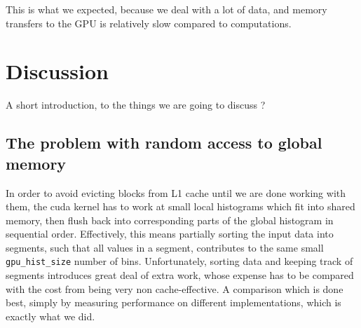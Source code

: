 \documentclass[12pt, a4paper, hidelinks]{article}
\renewcommand{\tt}[1]{\texttt{#1}}
\begin{document}
This is what we expected, because we deal with a lot of data, and memory transfers to the GPU is
relatively slow compared to computations.

\section{Discussion}
A short introduction, to the things we are going to discuss ?

\subsection{The problem with random access to global memory}
In order to avoid evicting blocks from L1 cache until we are done working with them,
the cuda kernel has to work at small local histograms which fit into shared memory,
then flush back into corresponding parts of the global histogram
in sequential order. Effectively, this means partially sorting the
input data into segments, such that all values in a segment,
contributes to the same small \tt{gpu\_hist\_size} number of bins.
Unfortunately, sorting data and keeping track of segments
introduces great deal of extra work, whose expense has to be compared
with the cost from being very non cache-effective.
A comparison which is done best,
simply by measuring performance on different implementations,
which is exactly what we did.


\end{document}
